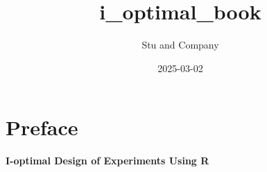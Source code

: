 \documentclass[
  letterpaper,
  DIV=11,
  numbers=noendperiod]{scrreprt}
\title{i\_optimal\_book}
\author{Stu and Company}
\date{2025-03-02}
\renewcommand*\contentsname{Table of contents}
\newcommand\contentsname{Table of contents}
\begin{document}
\maketitle

\renewcommand*\contentsname{Table of contents}
{
\hypersetup{linkcolor=}
\setcounter{tocdepth}{2}
\tableofcontents
}


\chapter*{Preface}\label{preface}


\textbf{I-optimal Design of Experiments Using R}
\end{document}
